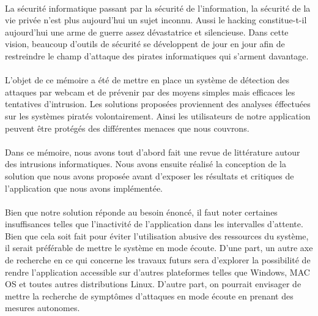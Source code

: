 \conclusion
\conclusion
		\paragraph{}
			La sécurité informatique passant par la sécurité de l'information, la sécurité de la vie privée n'est plus aujourd'hui un sujet inconnu. Aussi le hacking constitue-t-il aujourd'hui une arme de guerre assez dévastatrice et silencieuse. Dans cette vision, beaucoup d'outils de sécurité se développent de jour en jour afin de restreindre le champ d'attaque des pirates informatiques qui s'arment davantage. 
		\paragraph{}
			L'objet de ce mémoire a été de mettre en place un système de détection des attaques par webcam et de prévenir par des moyens simples mais efficaces les tentatives d'intrusion. Les solutions proposées proviennent des analyses éffectuées sur les systèmes piratés volontairement. Ainsi les utilisateurs de notre application peuvent être protégés des différentes menaces que nous couvrons.
		\paragraph{}
			Dans ce mémoire, nous avons tout d'abord fait une revue de littérature autour des intrusions informatiques. Nous avons ensuite réalisé la conception de la solution que nous avons proposée avant d'exposer les résultats
			et critiques de l'application que nous avons implémentée.
		\paragraph{}
			Bien que notre solution réponde au besoin énoncé, il faut noter certaines insuffisances telles que 
			l'inactivité de l'application dans les intervalles d'attente.  Bien que cela soit fait pour éviter l'utilisation abusive des ressources du système, il serait préférable de mettre le système en mode écoute. D'une part, un autre axe
			de recherche en ce qui concerne les travaux futurs sera d'explorer la possibilité de rendre 
			l'application accessible sur d'autres plateformes telles que Windows, MAC OS et toutes autres distributions Linux. D'autre part, on pourrait envisager de mettre la recherche de symptômes d'attaques en mode écoute en prenant des mesures autonomes. \cite{ehrig2006graph}